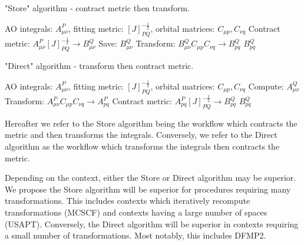 \begin{algorithm}[H]
\caption{"Store" algorithm - contract metric then transform.}
\begin{algorithmic}
\REQUIRE AO integrals: $A_{\mu \nu}^P$, fitting metric: $[J]_{PQ}^{-\frac{1}{2}}$, orbital matrices: $C_{\mu p}, C_{\nu q}$
\STATE Contract metric: $A_{\mu \nu}^P [J]_{PQ}^{-\frac{1}{2}} \rightarrow B_{\mu \nu}^Q$
\STATE Save: $B_{\mu \nu}^Q$
    \STATE Transform: $B_{\mu \nu}^QC_{\mu p}C_{\nu q} \rightarrow B_{p q}^Q$
\ENDFOR
\RETURN $B_{p q}^Q$
\end{algorithmic}
\end{algorithm}

\begin{algorithm}[H]
\caption{"Direct" algorithm - transform then contract metric.}
\begin{algorithmic}
\REQUIRE AO integrals: $A_{\mu \nu}^P$, fitting metric: $[J]_{PQ}^{-\frac{1}{2}}$, orbital matrices: $C_{\mu p}, C_{\nu q}$
\STATE Compute: $A_{\mu \nu}^Q$
    \STATE Transform: $A_{\mu \nu}^PC_{\mu p}C_{\nu q} \rightarrow A_{p q}^P$
    \STATE Contract metric: $A_{p q}^P [J]_{PQ}^{-\frac{1}{2}} \rightarrow B_{p q}^Q$
\ENDFOR
\RETURN $B_{p q}^Q$
\end{algorithmic}
\end{algorithm}

\noindent Hereafter we refer to the Store algorithm being the workflow which contracts the metric and then transforms the integrals. Conversely, 
we refer to the Direct algorithm as the workflow which transforms the integrals then contracts the metric. 

Depending on the context, either the Store or Direct algorithm may be superior. We propose the Store algorithm 
will be superior for procedures requiring
many transformations. This includes contexts which iteratively recompute transformations (MCSCF) and contexts 
having a large number of spaces (USAPT). 
Conversely, the Direct algorithm will be superior in contexts requiring a small number of transformations. Most notably, this includes DFMP2.

%


